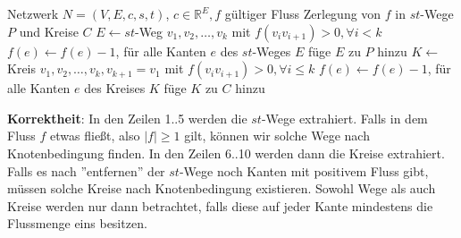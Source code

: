 \documentclass[11pt,a4paper,ngerman]{article}
\begin{document}
\begin{algorithmic}[1]
\Require Netzwerk $N = (V,E,c,s,t)$, $c \in \mathbb{R}^E, f$ gültiger Fluss 
\Ensure Zerlegung von $f$ in $st$-Wege $P$ und Kreise $C$
\State $E \gets st$-Weg $v_1,v_2,\ldots,v_k$ mit $f(v_iv_{i+1}) > 0, \forall i<k$
\State $f(e) \gets f(e) - 1$, für alle Kanten $e$ des $st$-Weges $E$
\State füge $E$ zu $P$ hinzu
\EndWhile
{}
\State $K \gets $ Kreis $v_1,v_2,\ldots,v_k,v_{k+1}=v_1$ mit $f(v_iv_{i+1}) > 0, \forall i \leq k$
\State $f(e) \gets f(e) - 1$, für alle Kanten $e$ des Kreises $K$
\State füge $K$ zu $C$ hinzu
\EndWhile
\end{algorithmic}

\textbf{Korrektheit}: In den Zeilen 1..5 werden die $st$-Wege extrahiert. Falls in dem Fluss $f$ etwas fließt, also $|f| \geq 1$ gilt, können wir solche Wege nach Knotenbedingung finden.
In den Zeilen 6..10 werden dann die Kreise extrahiert. Falls es nach ''entfernen'' der $st$-Wege noch Kanten mit positivem Fluss gibt, müssen solche Kreise nach Knotenbedingung existieren.
Sowohl Wege als auch Kreise werden nur dann
betrachtet, falls diese auf jeder Kante mindestens die Flussmenge eins besitzen.

\end{document}
